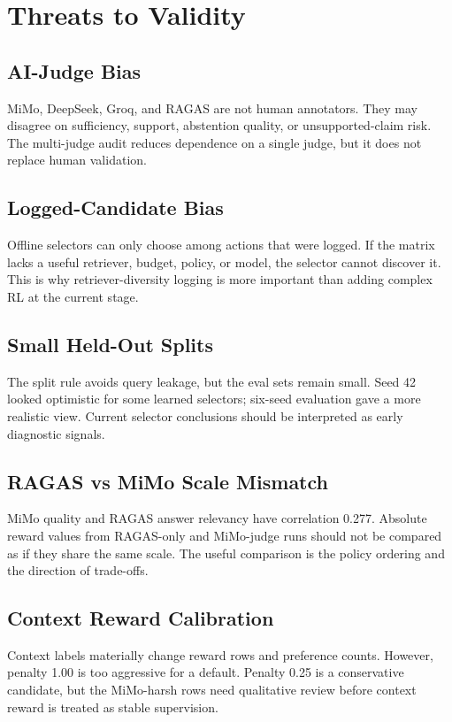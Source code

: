 \section{Threats to Validity}

\subsection{AI-Judge Bias}

MiMo, DeepSeek, Groq, and RAGAS are not human annotators. They may disagree on sufficiency, support, abstention quality, or unsupported-claim risk. The multi-judge audit reduces dependence on a single judge, but it does not replace human validation.

\subsection{Logged-Candidate Bias}

Offline selectors can only choose among actions that were logged. If the matrix lacks a useful retriever, budget, policy, or model, the selector cannot discover it. This is why retriever-diversity logging is more important than adding complex RL at the current stage.

\subsection{Small Held-Out Splits}

The split rule avoids query leakage, but the eval sets remain small. Seed 42 looked optimistic for some learned selectors; six-seed evaluation gave a more realistic view. Current selector conclusions should be interpreted as early diagnostic signals.

\subsection{RAGAS vs MiMo Scale Mismatch}

MiMo quality and RAGAS answer relevancy have correlation 0.277. Absolute reward values from RAGAS-only and MiMo-judge runs should not be compared as if they share the same scale. The useful comparison is the policy ordering and the direction of trade-offs.

\subsection{Context Reward Calibration}

Context labels materially change reward rows and preference counts. However, penalty 1.00 is too aggressive for a default. Penalty 0.25 is a conservative candidate, but the MiMo-harsh rows need qualitative review before context reward is treated as stable supervision.
